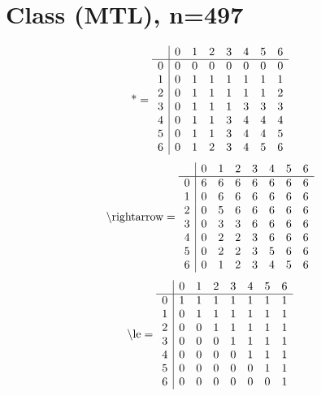 \documentclass[11pt]{article}
\begin{document}
\section{Class (MTL), n=497}
\[\text{*} = 
\begin{array}{r | r r r r r r r}
 & 0 & 1 & 2 & 3 & 4 & 5 & 6 \\ \hline
0 & 0 & 0 & 0 & 0 & 0 & 0 & 0 \\
1 & 0 & 1 & 1 & 1 & 1 & 1 & 1 \\
2 & 0 & 1 & 1 & 1 & 1 & 1 & 2 \\
3 & 0 & 1 & 1 & 1 & 3 & 3 & 3 \\
4 & 0 & 1 & 1 & 3 & 4 & 4 & 4 \\
5 & 0 & 1 & 1 & 3 & 4 & 4 & 5 \\
6 & 0 & 1 & 2 & 3 & 4 & 5 & 6 \\
\end{array}
\]
\[\text{\textbackslash rightarrow} = 
\begin{array}{r | r r r r r r r}
 & 0 & 1 & 2 & 3 & 4 & 5 & 6 \\ \hline
0 & 6 & 6 & 6 & 6 & 6 & 6 & 6 \\
1 & 0 & 6 & 6 & 6 & 6 & 6 & 6 \\
2 & 0 & 5 & 6 & 6 & 6 & 6 & 6 \\
3 & 0 & 3 & 3 & 6 & 6 & 6 & 6 \\
4 & 0 & 2 & 2 & 3 & 6 & 6 & 6 \\
5 & 0 & 2 & 2 & 3 & 5 & 6 & 6 \\
6 & 0 & 1 & 2 & 3 & 4 & 5 & 6 \\
\end{array}
\]
\[\text{\textbackslash le} = 
\begin{array}{r | r r r r r r r}
 & 0 & 1 & 2 & 3 & 4 & 5 & 6 \\ \hline
0 & 1 & 1 & 1 & 1 & 1 & 1 & 1 \\
1 & 0 & 1 & 1 & 1 & 1 & 1 & 1 \\
2 & 0 & 0 & 1 & 1 & 1 & 1 & 1 \\
3 & 0 & 0 & 0 & 1 & 1 & 1 & 1 \\
4 & 0 & 0 & 0 & 0 & 1 & 1 & 1 \\
5 & 0 & 0 & 0 & 0 & 0 & 1 & 1 \\
6 & 0 & 0 & 0 & 0 & 0 & 0 & 1 \\
\end{array}
\]
\end{document}
